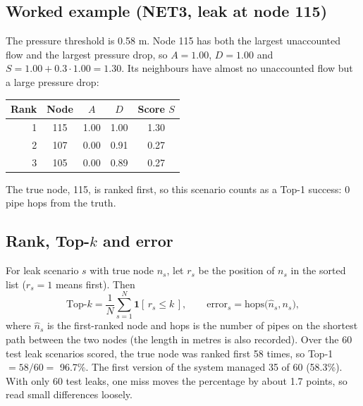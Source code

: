 \documentclass[11pt,a4paper]{article}
\begin{document}
\subsection{Worked example (NET3, leak at node 115)}
The pressure threshold is 0.58 m. Node 115 has both the largest unaccounted flow and the largest pressure drop, so $A=1.00$, $D=1.00$ and $S=1.00+0.3\cdot1.00=1.30$. Its neighbours have almost no unaccounted flow but a large pressure drop:
\begin{center}\begin{tabular}{@{}rcccc@{}}\toprule
Rank & Node & $A$ & $D$ & Score $S$ \\\midrule
1 & 115 & 1.00 & 1.00 & 1.30 \\
2 & 107 & 0.00 & 0.91 & 0.27 \\
3 & 105 & 0.00 & 0.89 & 0.27 \\
\bottomrule\end{tabular}\end{center}
The true node, 115, is ranked first, so this scenario counts as a Top-1 success: 0 pipe hops from the truth.

\subsection{Rank, Top-$k$ and error}
For leak scenario $s$ with true node $n_s$, let $r_s$ be the position of $n_s$ in the sorted list ($r_s=1$ means first). Then
\begin{equation}
\text{Top-}k=\frac{1}{N}\sum_{s=1}^{N}\mathbf{1}[\,r_s\le k\,],
\qquad
\text{error}_s=\text{hops}\big(\hat n_s,n_s\big),
\end{equation}
where $\hat n_s$ is the first-ranked node and hops is the number of pipes on the shortest path between the two nodes (the length in metres is also recorded). Over the 60 test leak scenarios scored, the true node was ranked first 58 times, so Top-1 $=58/60=$ 96.7\%. The first version of the system managed 35 of 60 (58.3\%). With only 60 test leaks, one miss moves the percentage by about 1.7 points, so read small differences loosely.
\end{document}

